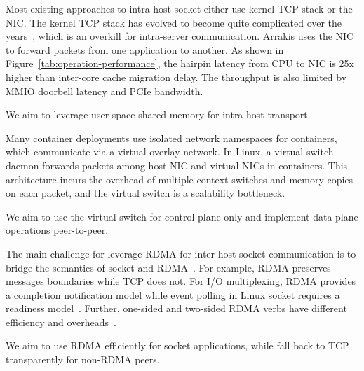 Most existing approaches to intra-host socket either use kernel TCP stack or the NIC.
The kernel TCP stack has evolved to become quite complicated over the years~\cite{yasukata2016stackmap}, which is an overkill 
for intra-server communication. %
Arrakis uses the NIC to forward packets from one application to another.
As shown in Figure~\ref{tab:operation-performance}, the hairpin latency from CPU to NIC is 25x higher than inter-core cache migration delay.
The throughput is also limited by MMIO doorbell latency and PCIe bandwidth.

We aim to leverage user-space shared memory for intra-host transport.

Many container deployments use isolated network namespaces for containers, which communicate via a virtual overlay network.
In Linux, a virtual switch daemon forwards packets among host NIC and virtual NICs in containers.
This architecture incurs the overhead of multiple context switches and memory copies on each packet, and the virtual switch is a scalability bottleneck.

We aim to use the virtual switch for control plane only and implement data plane operations peer-to-peer.

The main challenge for leverage RDMA for inter-host socket communication is to bridge the semantics of socket and RDMA~\cite{dragojevic2014farm}.
For example, RDMA preserves messages boundaries while TCP does not.
For I/O multiplexing, RDMA provides a completion notification model while event polling in Linux socket requires a readiness model~\cite{han2012megapipe}.
Further, one-sided and two-sided RDMA verbs have different efficiency and overheads~\cite{kalia2014using,kaminsky2016design}.

We aim to use RDMA efficiently for socket applications, while fall back to TCP transparently for non-RDMA peers.

